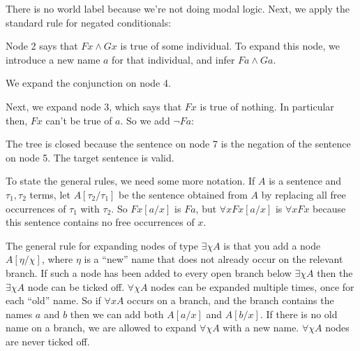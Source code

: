 \medskip
\begin{center}
\end{center}
\medskip%
There is no world label because we're not doing modal logic. Next, we apply the
standard rule for negated conditionals:%
\medskip
\begin{center}
\end{center}

\medskip\noindent
Node 2 says that $Fx \land Gx$ is true of some individual. To
expand this node, we introduce a new name $a$ for that individual, and infer
$Fa \land Ga$.
\medskip
\begin{center}
\end{center}

\medskip\noindent%
We expand the conjunction on node 4.
\medskip
\begin{center}
\end{center}
Next, we expand node 3, which says that $Fx$ is true of nothing. In particular
then, $Fx$ can't be true of $a$. So we add $\neg Fa$:

\medskip
\begin{center} 
\end{center}

\medskip\noindent%
The tree is closed because the sentence on node 7 is the negation of the
sentence on node 5. The target sentence is valid.

To state the general rules, we need some more notation. If $A$ is a sentence and $\tau_{1}, \tau_{2}$ terms, let $A[\tau_{2}/\tau_{1}]$ be the sentence
obtained from $A$ by replacing all free occurrences of $\tau_{1}$ with $\tau_{2}$. So
$Fx[a/x]$ is $Fa$, but $\forall x Fx[a/x]$ is $\forall x Fx$ because this
sentence contains no free occurrences of $x$.

The general rule for expanding nodes of type $\exists \chi A$ is that you add a
node $A[\eta/\chi]$, where $\eta$ is a ``new'' name that does not already occur
on the relevant branch. If such a node has been added to every open branch below
$\exists \chi A$ then the $\exists \chi A$ node can be ticked off.
$\forall \chi A$ nodes can be expanded multiple times, once for each ``old''
name. So if $\forall x A$ occurs on a branch, and the branch contains the names
$a$ and $b$ then we can add both $A[a/x]$ and $A[b/x]$. If there is no old name
on a branch, we are allowed to expand $\forall \chi A$ with a new name.
$\forall \chi A$ nodes are never ticked off.


